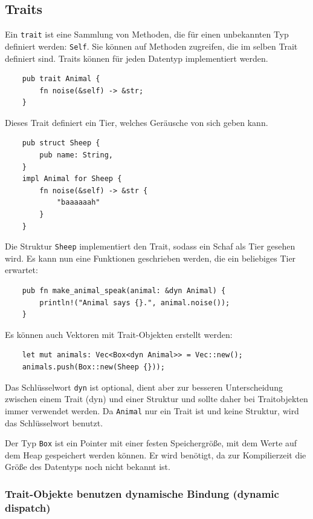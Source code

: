\subsection{Traits}

Ein \verb"trait" ist eine Sammlung von Methoden, die für einen unbekannten Typ definiert werden: \verb"Self". Sie können auf Methoden zugreifen, die im selben Trait definiert sind. Traits können für jeden Datentyp implementiert werden. \cite{RustExample}

\begin{lstlisting}
    pub trait Animal {
        fn noise(&self) -> &str;
    }
\end{lstlisting}

Dieses Trait definiert ein Tier, welches Geräusche von sich geben kann.

\begin{lstlisting}
    pub struct Sheep {
        pub name: String,
    }
    impl Animal for Sheep {
        fn noise(&self) -> &str {
            "baaaaaah"
        }
    }
\end{lstlisting}

Die Struktur \verb"Sheep" implementiert den Trait, sodass ein Schaf als Tier gesehen wird. Es kann nun eine Funktionen geschrieben werden, die ein beliebiges Tier erwartet:

\begin{lstlisting}
    pub fn make_animal_speak(animal: &dyn Animal) {
        println!("Animal says {}.", animal.noise());
    }
\end{lstlisting}

Es können auch Vektoren mit Trait-Objekten erstellt werden:

\begin{lstlisting}
    let mut animals: Vec<Box<dyn Animal>> = Vec::new();
    animals.push(Box::new(Sheep {}));
\end{lstlisting}

Das Schlüsselwort \verb"dyn" ist optional, dient aber zur besseren Unterscheidung zwi\-schen einem Trait (dyn) und einer Struktur und sollte daher bei Traitobjekten immer verwendet werden. Da \verb"Animal" nur ein Trait ist und keine Struktur, wird das Schlüsselwort benutzt.

Der Typ \verb"Box" ist ein Pointer mit einer festen Speichergröße, mit dem Werte auf dem Heap gespeichert werden können. Er wird benötigt, da zur Kompilierzeit die Größe des Datentyps noch nicht bekannt ist.

\subsubsection{Trait-Objekte benutzen dynamische Bindung (dynamic dispatch)}\label{dynamicdispatch}

